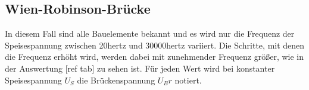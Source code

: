 \subsection{Wien-Robinson-Brücke}

In diesem Fall sind alle Bauelemente bekannt und es wird nur die Frequenz der Speisespannung
zwischen 20\si{hertz} und 30000\si{hertz} variiert. Die Schritte, mit denen die Frequenz erhöht
wird, werden dabei mit zunehmender Frequenz größer, wie in der Auswertung [ref tab] zu sehen ist.
Für jeden Wert wird bei konstanter Speisespannung $U_S$ die Brückenspannung $U_Br$ notiert.


